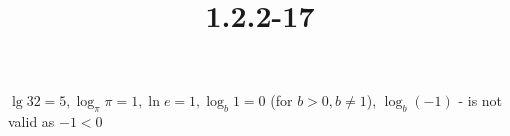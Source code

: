 \documentclass{article}
\title{1.2.2-17}
\begin{document}
\maketitle

\( \lg 32 = 5, \log_\pi{\pi} = 1, \ln{e} = 1, \log_b{1} = 0 \) (for \( b > 0, b \neq 1 \)), \( \log_b{(-1)} \) - is not valid as \( -1 < 0 \)
\end{document}
